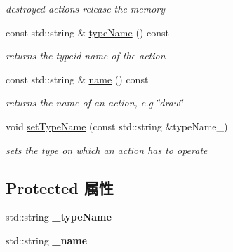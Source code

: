 \begin{DoxyCompactItemize}
\begin{DoxyCompactList}\small\item\em destroyed actions release the memory \end{DoxyCompactList}\item 
\hypertarget{classg2o_1_1HyperGraphElementAction_a0bc89d3bf6b1114dfb0e7df874b087d2}{const std\-::string \& \hyperlink{classg2o_1_1HyperGraphElementAction_a0bc89d3bf6b1114dfb0e7df874b087d2}{type\-Name} () const }\label{classg2o_1_1HyperGraphElementAction_a0bc89d3bf6b1114dfb0e7df874b087d2}

\begin{DoxyCompactList}\small\item\em returns the typeid name of the action \end{DoxyCompactList}\item 
\hypertarget{classg2o_1_1HyperGraphElementAction_ad585ae95767ee74789a18c758f750cfb}{const std\-::string \& \hyperlink{classg2o_1_1HyperGraphElementAction_ad585ae95767ee74789a18c758f750cfb}{name} () const }\label{classg2o_1_1HyperGraphElementAction_ad585ae95767ee74789a18c758f750cfb}

\begin{DoxyCompactList}\small\item\em returns the name of an action, e.\-g \char`\"{}draw\char`\"{} \end{DoxyCompactList}\item 
\hypertarget{classg2o_1_1HyperGraphElementAction_ae7ed5834d50fb0ff0fef8ec45caaaa3f}{void \hyperlink{classg2o_1_1HyperGraphElementAction_ae7ed5834d50fb0ff0fef8ec45caaaa3f}{set\-Type\-Name} (const std\-::string \&type\-Name\-\_\-)}\label{classg2o_1_1HyperGraphElementAction_ae7ed5834d50fb0ff0fef8ec45caaaa3f}

\begin{DoxyCompactList}\small\item\em sets the type on which an action has to operate \end{DoxyCompactList}\end{DoxyCompactItemize}
\subsection*{Protected 属性}
\begin{DoxyCompactItemize}
\item 
\hypertarget{classg2o_1_1HyperGraphElementAction_ae05082e218d213f8db5de7a79769f97c}{std\-::string {\bfseries \-\_\-type\-Name}}\label{classg2o_1_1HyperGraphElementAction_ae05082e218d213f8db5de7a79769f97c}

\item 
\hypertarget{classg2o_1_1HyperGraphElementAction_a31245b0a79dfb357e3b345ff57b7b491}{std\-::string {\bfseries \-\_\-name}}\label{classg2o_1_1HyperGraphElementAction_a31245b0a79dfb357e3b345ff57b7b491}

\end{DoxyCompactItemize}


